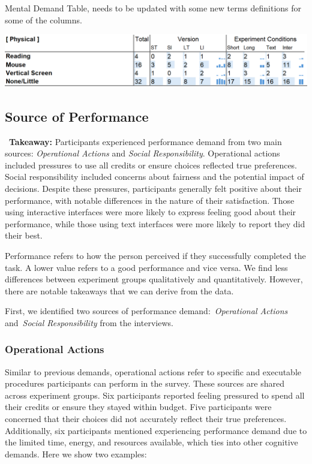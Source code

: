 \begin{table}[h]
    \caption{Mental Demand Table, needs to be updated with some new terms definitions for some of the columns.}
    \label{tbl:physical}
    \includegraphics[width=\linewidth]{content/image/cog/physical_table.png}
\end{table}

\subsection{Source of Performance}
\label{sec:performance}
\vspace{5pt}
\begin{tldrbox}
    \faInfoCircle~\xspace\textbf{Takeaway:} Participants experienced performance demand from two main sources: \textit{Operational Actions} and \textit{Social Responsibility}. Operational actions included pressures to use all credits or ensure choices reflected true preferences. Social responsibility included concerns about fairness and the potential impact of decisions. Despite these pressures, participants generally felt positive about their performance, with notable differences in the nature of their satisfaction. Those using interactive interfaces were more likely to express feeling good about their performance, while those using text interfaces were more likely to report they did their best.
\end{tldrbox}

Performance refers to how the person perceived if they successfully completed the task. A lower value refers to a good performance and vice versa. We find less differences between experiment groups qualitatively and quantitatively. However, there are notable takeaways that we can derive from the data.

First, we identified two sources of performance demand:~\textit{Operational Actions} and~\textit{Social Responsibility} from the interviews. 

\subsubsection{Operational Actions}
Similar to previous demands, operational actions refer to specific and executable procedures participants can perform in the survey. These sources are shared across experiment groups. Six participants reported feeling pressured to spend all their credits or ensure they stayed within budget. Five participants were concerned that their choices did not accurately reflect their true preferences. Additionally, six participants mentioned experiencing performance demand due to the limited time, energy, and resources available, which ties into other cognitive demands. Here we show two examples:

